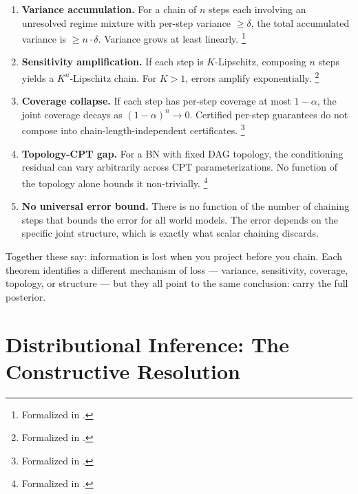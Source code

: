 \documentclass[11pt,openany]{report}
\begin{document}
\begin{enumerate}
\item \textbf{Variance accumulation.}  For a chain of $n$ steps each
  involving an unresolved regime mixture with per-step variance
  $\ge \delta$, the total accumulated variance is
  $\ge n \cdot \delta$.  Variance grows at least linearly.%
  \footnote{Formalized in
  .}

\item \textbf{Sensitivity amplification.}  If each step is
  $K$-Lipschitz, composing $n$ steps yields a $K^n$-Lipschitz chain.
  For $K > 1$, errors amplify exponentially.%
  \footnote{Formalized in
  .}

\item \textbf{Coverage collapse.}  If each step has per-step
  coverage at most $1 - \alpha$, the joint coverage decays as
  $(1 - \alpha)^n \to 0$.  Certified per-step guarantees do not
  compose into chain-length-independent certificates.%
  \footnote{Formalized in
  .}

\item \textbf{Topology-CPT gap.}  For a BN with fixed DAG topology,
  the conditioning residual can vary arbitrarily across CPT
  parameterizations.  No function of the topology alone bounds
  it non-trivially.%
  \footnote{Formalized in
  .}

\item \textbf{No universal error bound.}  There is no function of
  the number of chaining steps that bounds the error for all world
  models.  The error depends on the specific joint structure, which
  is exactly what scalar chaining discards.
\end{enumerate}

\noindent
Together these say: information is lost when you project before you
chain.  Each theorem identifies a different mechanism of loss ---
variance, sensitivity, coverage, topology, or structure --- but they
all point to the same conclusion: carry the full posterior.

\section{Distributional Inference: The Constructive Resolution}
\end{document}

